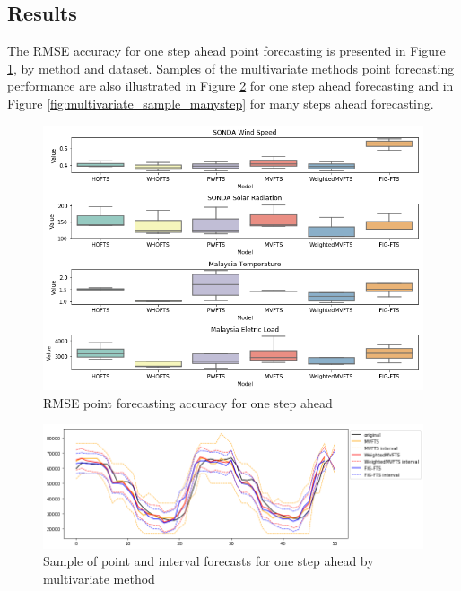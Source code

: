 \subsection{Results}
\label{sec:multivariate_results}

The RMSE accuracy for one step ahead point forecasting is presented in Figure \ref{fig:multivariate_point_results}, by method and dataset. Samples of the multivariate methods point forecasting performance are also illustrated in Figure \ref{fig:multivariate_sample_onestep} for one step ahead forecasting and in Figure \ref{fig:multivariate_sample_manystep} for many steps ahead forecasting.

\begin{figure}[htb]
    \centering
    \includegraphics[width=\textwidth]{figures/multivariate_point_results.png}
    \caption{RMSE point forecasting accuracy for one step ahead}
    \label{fig:multivariate_point_results}
\end{figure}

\begin{figure}[htb]
    \centering
    \includegraphics[width=\textwidth]{figures/multivariate_sample_onestep.png}
    \caption{Sample of point and interval forecasts for one step ahead by multivariate method}
    \label{fig:multivariate_sample_onestep}
\end{figure}

